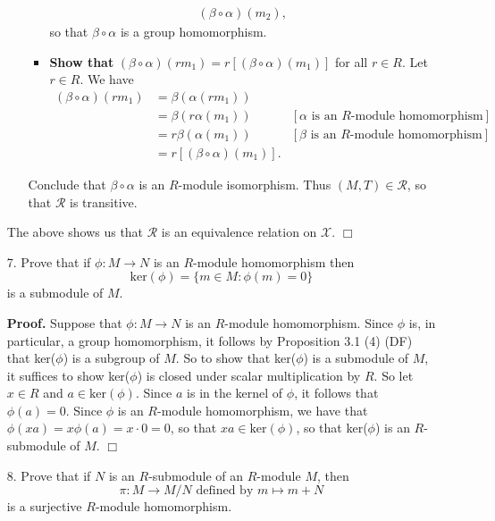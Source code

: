 \documentclass[9pt]{article}
\newcommand{\qed}{\hfill \ensuremath{\Box}}
\begin{document}
\begin{enumerate}
\begin{itemize}
\begin{itemize}
\begin{align*}
                                    (\beta\circ\alpha)(m_2),
                        \end{align*}
                        so that $\beta\circ\alpha$ is a group homomorphism.
                  \item \textbf{Show that }
                        $(\beta\circ\alpha)(rm_1) = r[(\beta\circ\alpha)(m_1)]$
                        for all $r \in R$. Let $r \in R$. We have
                        \begin{align*}
                           (\beta\circ\alpha)(rm_1) &= \beta(\alpha(rm_1)) \\
                              &= \beta(r\alpha(m_1))
                              &[\alpha \text{ is an }R
                                \text{-module homomorphism}] \\
                              &= r\beta(\alpha(m_1))
                              &[\beta \text{ is an }R
                                \text{-module homomorphism}] \\
                              &= r[(\beta\circ\alpha)(m_1)].
                        \end{align*}
               \end{itemize}
               Conclude that $\beta\circ\alpha$ is an $R$-module isomorphism.
               Thus $(M, T) \in \mathcal{R}$, so that $\mathcal{R}$ is
               transitive.
      \end{itemize}
      The above shows us that $\mathcal{R}$ is an equivalence relation on
      $\mathscr{X}$. \qed
   \item[7.]   Prove that if $\phi : M \rightarrow N$ is an $R$-module
               homomorphism then
               $$\text{ker}(\phi) = \{m \in M : \phi(m) = 0\}$$
               is a submodule of $M$.

      \textbf{Proof.} Suppose that $\phi : M \rightarrow N$ is an $R$-module
      homomorphism. Since $\phi$ is, in particular, a group homomorphism, it
      follows by Proposition 3.1 (4) (DF) that ker($\phi$) is a subgroup of $M$.
      So to show that ker($\phi$) is a submodule of $M$, it suffices to show
      ker($\phi$) is closed under scalar multiplication by $R$. So let $x \in R$
      and $a \in \text{ker}(\phi)$. Since $a$ is in the kernel of $\phi$, it
      follows that $\phi(a) = 0$. Since $\phi$ is an $R$-module homomorphism, we
      have that $\phi(xa) = x\phi(a) = x \cdot 0 = 0$, so that
      $xa \in \text{ker}(\phi)$, so that ker($\phi$) is an $R$-submodule of $M$.
      \qed
   \item[8.]   Prove that if $N$ is an $R$-submodule of an $R$-module $M$, then
               $$\pi : M \rightarrow M/N \text{ defined by } m \mapsto m + N$$
               is a surjective $R$-module homomorphism.
               

\end{enumerate}
\end{document}
